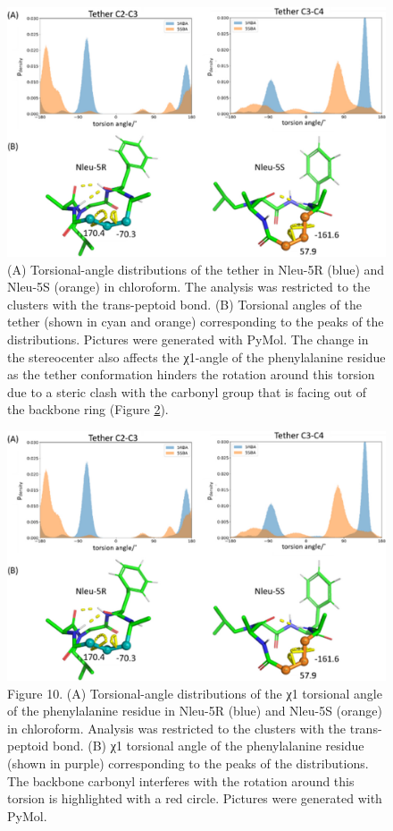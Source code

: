 \begin{figure}
    \centering
    \includegraphics[width=\textwidth]{7_chapter_5/fig/results/dihedral_dist.jpeg}
    \caption{(A) Torsional-angle distributions of the tether in Nleu-5R (blue) and Nleu-5S (orange) in chloroform. The analysis was restricted to the clusters with the trans-peptoid bond. (B) Torsional angles of the tether (shown in cyan and orange) corresponding to the peaks of the distributions. Pictures were generated with PyMol. \cite{DeLano2020} The change in the stereocenter also affects the χ1-angle of the phenylalanine residue as the tether conformation hinders the rotation around this torsion due to a steric clash with the carbonyl group that is facing out of the backbone ring (Figure \ref{fig: dihedralDistSubst}).}
    \label{fig: dihedralDist}
\end{figure}

\begin{figure}
    \centering
    \includegraphics[width=\textwidth]{7_chapter_5/fig/results/dihedral_dist.jpeg}
    \caption{Figure 10. (A) Torsional-angle distributions of the χ1 torsional angle of the phenylalanine residue in Nleu-5R (blue) and Nleu-5S (orange) in chloroform. Analysis was restricted to the clusters with the trans-peptoid bond. (B) χ1 torsional angle of the phenylalanine residue (shown in purple) corresponding to the peaks of the distributions. The backbone carbonyl interferes with the rotation around this torsion is highlighted with a red circle. Pictures were generated with PyMol. \cite{DeLano2020}}
    \label{fig: dihedralDistSubst}
\end{figure}


